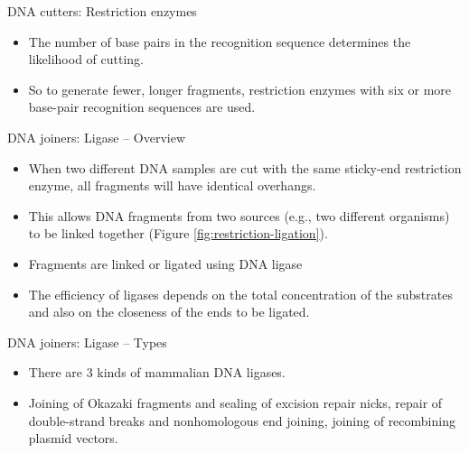 \documentclass[ignorenonframetext,aspectratio=169]{beamer}
\providecommand{\tightlist}{%
  \setlength{\itemsep}{0pt}\setlength{\parskip}{0pt}}
\begin{document}
\begin{frame}{DNA cutters: Restriction enzymes}
\protect\hypertarget{dna-cutters-restriction-enzymes-4}{}

\begin{itemize}
\tightlist
\item
  The number of base pairs in the recognition sequence determines the
  likelihood of cutting.
\item
  So to generate fewer, longer fragments, restriction enzymes with six
  or more base-pair recognition sequences are used.
\end{itemize}

\end{frame}

\begin{frame}{DNA joiners: Ligase -- Overview}
\protect\hypertarget{dna-joiners-ligase-overview}{}

\begin{itemize}
\tightlist
\item
  When two different DNA samples are cut with the same sticky-end
  restriction enzyme, all fragments will have identical overhangs.
\item
  This allows DNA fragments from two sources (e.g., two different
  organisms) to be linked together (Figure
  \ref{fig:restriction-ligation}).
\item
  Fragments are linked or ligated using DNA ligase
\item
  The efficiency of ligases depends on the total concentration of the
  substrates and also on the closeness of the ends to be ligated.
\end{itemize}

\end{frame}

\begin{frame}{DNA joiners: Ligase -- Types}
\protect\hypertarget{dna-joiners-ligase-types}{}

\begin{itemize}
\tightlist
\item
  There are 3 kinds of mammalian DNA ligases.
\item
  Joining of Okazaki fragments and sealing of excision repair nicks,
  repair of double-strand breaks and nonhomologous end joining, joining
  of recombining plasmid vectors.
\end{itemize}

\end{frame}
\end{document}
